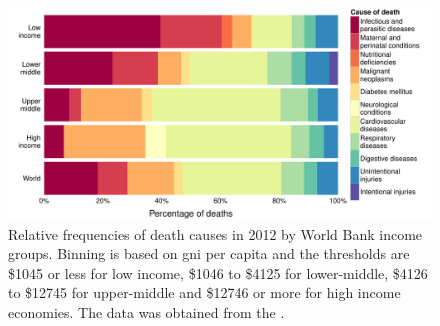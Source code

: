 \begin{knitrout}
\color{fgcolor}\begin{figure}
\includegraphics[width=\maxwidth]{figures/R/who-deaths/topCauses-who-deaths_top-causes-1} \caption[Relative frequencies of death causes in 2012 by World Bank income groups]{Relative frequencies of death causes in 2012 by World Bank income groups. Binning is based on \acrfull{gni} per capita and the thresholds are \$1045 or less for low income, \$1046 to \$4125 for lower-middle, \$4126 to \$12745 for upper-middle and \$12746 or more for high income economies. The data was obtained from the \citet{WHO2012}.}\label{fig:who-deaths_top-causes}
\end{figure}


\end{knitrout}

\newcommand{\knitrTotalDeathsTwelve}{58.3 million}

\newcommand{\knitrPercentageDeathsTwelveHigh}{20.1\%}
\newcommand{\knitrPercentageDeathsTwelveLow}{14\%}
\newcommand{\knitrPercentageDeathsTwelveLmid}{36.5\%}
\newcommand{\knitrPercentageDeathsTwelveUmid}{29.4\%}

\newcommand{\knitrPercentDeathsTwelveLowInfect}{39.6\%}
\newcommand{\knitrPercentDeathsTwelveLowPerinat}{20.8\%}
\newcommand{\knitrPercentDeathsTwelveLmidInfect}{23.3\%}
\newcommand{\knitrPercentDeathsTwelveLmidCardio}{26.5\%}
\newcommand{\knitrPercentDeathsTwelveUmidInfect}{8.5\%}
\newcommand{\knitrPercentDeathsTwelveHighInfect}{6.7\%}
\newcommand{\knitrPercentDeathsTwelveWorldInfect}{18.3\%}
\newcommand{\knitrPercentDeathsTwelveWorldCardio}{33.7\%}
\newcommand{\knitrPercentDeathsTwelveWorldCancer}{15.8\%}
